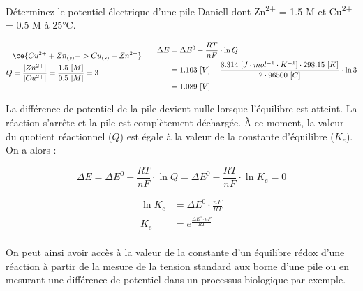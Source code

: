 \documentclass[
  11pt,
  a4paper,
  openany]{book}
\begin{document}
\clearpage

\begin{Exercise}

Déterminez le potentiel électrique d'une pile Daniell dont \textbar Zn\textsuperscript{2+}\textbar{} = 1.5 M et \textbar Cu\textsuperscript{2+}\textbar{} = 0.5 M à 25°C.


\end{Exercise}

\begin{Answer}
\[
\begin{split}
  & \ce{Cu^{2+} + Zn_{(s)} -> Cu_{(s)} + Zn^{2+}} \\
  Q &= \frac{|Zn^{2+}|}{|Cu^{2+}|} = \frac{1.5\ [M]}{0.5\ [M]} = 3
\end{split}
\qquad
\begin{split}
  \Delta E &= \Delta E^{0} - \frac{RT}{nF} \cdot \ln{Q} \\
  &= 1.103\ [V] - \frac{8.314\ [J \cdot mol^{-1} \cdot K^{-1}] \cdot 298.15\ [K]}{2 \cdot 96500\ [C]} \cdot \ln{3} \\
  &= 1.089\ [V]
\end{split}
\]

\end{Answer}

La différence de potentiel de la pile devient nulle lorsque l'équilibre est atteint. La réaction s'arrête et la pile est complètement déchargée. À ce moment, la valeur du quotient réactionnel (\(Q\)) est égale à la valeur de la constante d'équilibre (\(K_e\)). On a alors :

\[
\Delta E = \Delta E^{0} - \frac{RT}{nF} \cdot \ln{Q} = \Delta E^{0} - \frac{RT}{nF} \cdot \ln{K_{e}} = 0
\]

\[
\begin{split}
\ln{K_{e}} &= \Delta E^{0} \cdot \frac{nF}{RT} \\
K_{e} &= e^{\frac{\Delta E^{0}\cdot nF}{RT}} \\
\end{split}
\]

On peut ainsi avoir accès à la valeur de la constante d'un équilibre rédox d'une réaction à partir de la mesure de la tension standard aux borne d'une pile ou en mesurant une différence de potentiel dans un processus biologique par exemple.


\clearpage
\end{document}
